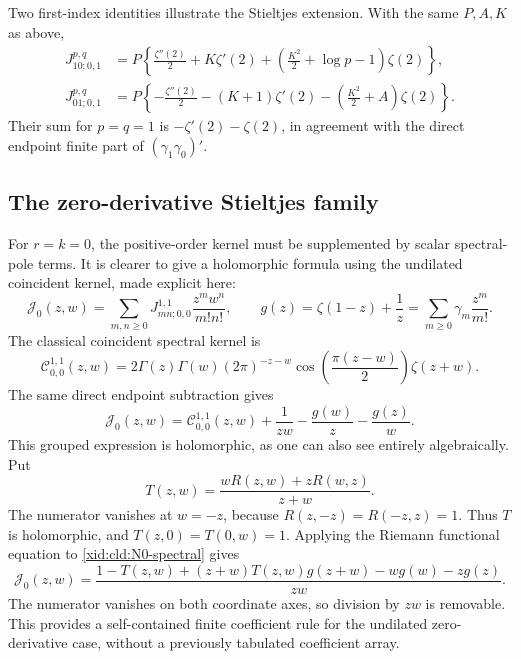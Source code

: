 \documentclass[11pt,a4paper]{article}
\numberwithin{equation}{section}
\theoremstyle{definition}
\theoremstyle{remark}
\begin{document}
Two first-index identities illustrate the Stieltjes extension.  With
the same $P,A,K$ as above,
\begin{align}
 J_{10;0,1}^{p,q}
 &=P\left\{\frac{\zeta''(2)}2+K\zeta'(2)
            +\left(\frac{K^2}2+\log p-1\right)\zeta(2)\right\},\\
 J_{01;0,1}^{p,q}
 &=P\left\{-\frac{\zeta''(2)}2-(K+1)\zeta'(2)
            -\left(\frac{K^2}2+A\right)\zeta(2)\right\}.
 \label{xid:cld:first-jets}
\end{align}
Their sum for $p=q=1$ is $-\zeta'(2)-\zeta(2)$, in agreement with
the direct endpoint finite part of $(\gamma_1\gamma_0)'$.

\subsection{The zero-derivative Stieltjes family}

For $r=k=0$, the positive-order kernel must be supplemented by scalar
spectral-pole terms.  It is clearer to give a holomorphic formula using
the undilated coincident kernel, made explicit here:
\[
 \mathscr J_0(z,w)=\sum_{m,n\ge0}J_{mn;0,0}^{1,1}
                         \frac{z^mw^n}{m!n!},
 \qquad g(z)=\zeta(1-z)+\frac1z
          =\sum_{m\ge0}\gamma_m\frac{z^m}{m!}.
\]
The classical coincident spectral kernel is
\begin{equation}
 \mathscr C_{0,0}^{1,1}(z,w)
 =2\Gamma(z)\Gamma(w)(2\pi)^{-z-w}
       \cos\!\left(\frac{\pi(z-w)}2\right)\zeta(z+w).
 \label{xid:cld:N0-spectral}
\end{equation}
The same direct endpoint subtraction gives
\begin{equation}
 \mathscr J_0(z,w)=\mathscr C_{0,0}^{1,1}(z,w)+\frac1{zw}
                             -\frac{g(w)}z-\frac{g(z)}w.
 \label{xid:cld:J0-explicit}
\end{equation}
This grouped expression is holomorphic, as one can also see entirely
algebraically.  Put
\[
 T(z,w)=\frac{wR(z,w)+zR(w,z)}{z+w}.
\]
The numerator vanishes at $w=-z$, because $R(z,-z)=R(-z,z)=1$.
Thus $T$ is holomorphic, and $T(z,0)=T(0,w)=1$.  Applying the Riemann
functional equation to \eqref{xid:cld:N0-spectral} gives
\begin{equation}
 \mathscr J_0(z,w)=
 \frac{1-T(z,w)+(z+w)T(z,w)g(z+w)-wg(w)-zg(z)}{zw}.
 \label{xid:cld:J0-removable}
\end{equation}
The numerator vanishes on both coordinate axes, so division by $zw$
is removable.  This provides a self-contained finite coefficient rule
for the undilated zero-derivative case, without a previously tabulated
coefficient array.
\end{document}
